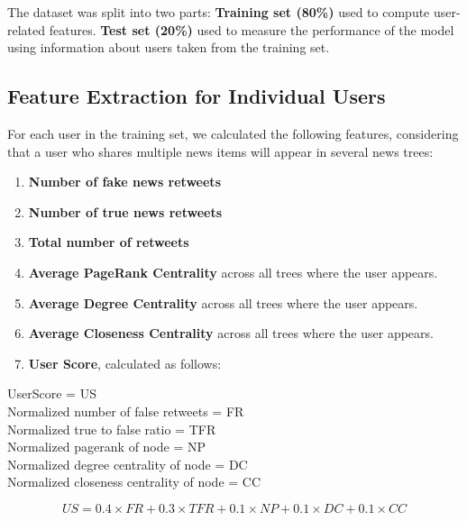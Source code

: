 \documentclass[11pt,a4paper]{article}
\begin{document}
The dataset was split into two parts: \textbf{Training set (80\%)} used to compute user-related features. \textbf{Test set (20\%)} used to measure the performance of the model using information about users taken from the training set.

\subsection*{Feature Extraction for Individual Users}
For each user in the training set, we calculated the following features, considering that a user who shares multiple news items will appear in several news trees:
\begin{enumerate}
    \item \textbf{Number of fake news retweets}
    \item \textbf{Number of true news retweets}
    \item \textbf{Total number of retweets}
    \item \textbf{Average PageRank Centrality} across all trees where the user appears.
    \item \textbf{Average Degree Centrality} across all trees where the user appears.
    \item \textbf{Average Closeness Centrality} across all trees where the user appears.
    \item \textbf{User Score}, calculated as follows:
    
\end{enumerate}

\begin{center}
	UserScore = US \\
	Normalized number of false retweets = FR \\
	Normalized true to false ratio = TFR \\
	Normalized pagerank of node = NP \\
	Normalized degree centrality of node = DC \\
	Normalized closeness centrality of node = CC \\
\end{center}

\begin{equation}
	US = 0.4 \times FR + 0.3 \times TFR + 0.1 \times NP + 0.1 \times DC + 0.1 \times CC
\end{equation}
\end{document}
